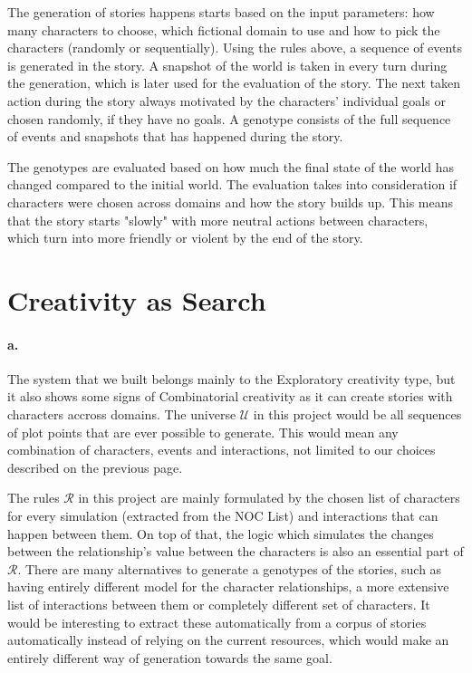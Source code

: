 \documentclass[english]{tktltiki}
\begin{document}
    The generation of stories happens starts based on the input parameters: how many characters to choose, which fictional domain to use and how to pick the characters (randomly or sequentially). Using the rules above, a sequence of events is generated in the story. A snapshot of the world is taken in every turn during the generation, which is later used for the evaluation of the story. The next taken action during the story always motivated by the characters' individual goals or chosen randomly, if they have no goals. A genotype consists of the full sequence of events and snapshots that has happened during the story. 

    The genotypes are evaluated based on how much the final state of the world has changed compared to the initial world. The evaluation takes into consideration if characters were chosen across domains and how the story builds up. This means that the story starts "slowly" with more neutral actions between characters, which turn into more friendly or violent by the end of the story.
    
    \pagebreak
    
    \section{Creativity as Search}
    \paragraph{a.}
    The system that we built belongs mainly to the Exploratory creativity type, but it also shows some signs of Combinatorial creativity as it can create stories with characters accross domains. The universe $\mathcal{U}$ in this project would be all sequences of plot points that are ever possible to generate. This would mean any combination of characters, events and interactions, not limited to our choices described on the previous page. 
    
    The rules $\mathcal{R}$ in this project are mainly formulated by the chosen list of characters for every simulation (extracted from the NOC List) and interactions that can happen between them. On top of that, the logic which simulates the changes between the relationship's value between the characters is also an essential part of $\mathcal{R}$. There are many alternatives to generate a genotypes of the stories, such as having entirely different model for the character relationships, a more extensive list of interactions between them or completely different set of characters. It would be interesting to extract these automatically from a corpus of stories automatically instead of relying on the current resources, which would make an entirely different way of generation towards the same goal. 
\end{document}
